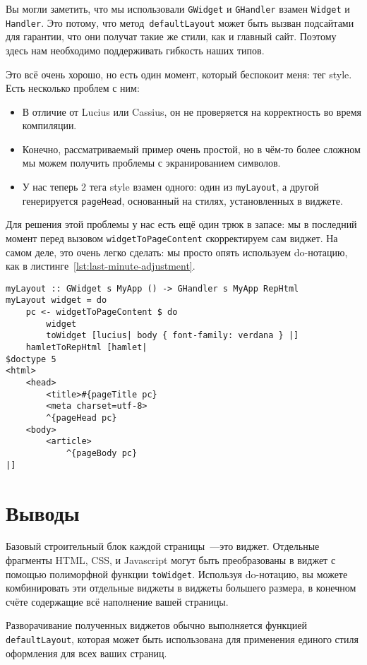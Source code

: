 \begin{remark}
    Вы могли заметить, что мы использовали \lstinline'GWidget' и
    \lstinline'GHandler' взамен \lstinline'Widget' и \lstinline'Handler'. Это
    потому, что метод~\lstinline'defaultLayout' может быть вызван подсайтами
    для гарантии, что они получат такие же стили, как и главный сайт. Поэтому
    здесь нам необходимо поддерживать гибкость наших типов.
\end{remark}

Это всё очень хорошо, но есть один момент, который беспокоит меня: тег style.
Есть несколько проблем с ним:
\begin{itemize}
    \item В отличие от Lucius или Cassius, он не проверяется на корректность во
        время компиляции.

    \item Конечно, рассматриваемый пример очень простой, но в чём-то более
        сложном мы можем получить проблемы с экранированием символов.

    \item У нас теперь 2 тега style взамен одного: один из
        \lstinline'myLayout', а другой генерируется \lstinline'pageHead',
        основанный на стилях, установленных в виджете.
\end{itemize}

Для решения этой проблемы у нас есть ещё один трюк в запасе: мы в последний
момент перед вызовом \lstinline'widgetToPageContent' скорректируем сам виджет.
На самом деле, это очень легко сделать: мы просто опять используем do-нотацию,
как в листинге~\ref{lst:last-minute-adjustment}.
\begin{lstlisting}[caption={Корректировка виджета <<в последний момент>>},label={lst:last-minute-adjustment}]
myLayout :: GWidget s MyApp () -> GHandler s MyApp RepHtml
myLayout widget = do
    pc <- widgetToPageContent $ do
        widget
        toWidget [lucius| body { font-family: verdana } |]
    hamletToRepHtml [hamlet|
$doctype 5
<html>
    <head>
        <title>#{pageTitle pc}
        <meta charset=utf-8>
        ^{pageHead pc}
    <body>
        <article>
            ^{pageBody pc}
|]
\end{lstlisting}

\section{Выводы}
Базовый строительный блок каждой страницы~---это виджет. Отдельные фрагменты
HTML, CSS, и Javascript могут быть преобразованы в виджет с помощью полиморфной
функции \lstinline'toWidget'. Используя do-нотацию, вы можете комбинировать эти
отдельные виджеты в виджеты большего размера, в конечном счёте содержащие всё
наполнение вашей страницы.

Разворачивание полученных виджетов обычно выполняется функцией
\lstinline'defaultLayout', которая может быть использована для применения
единого стиля оформления для всех ваших страниц.
